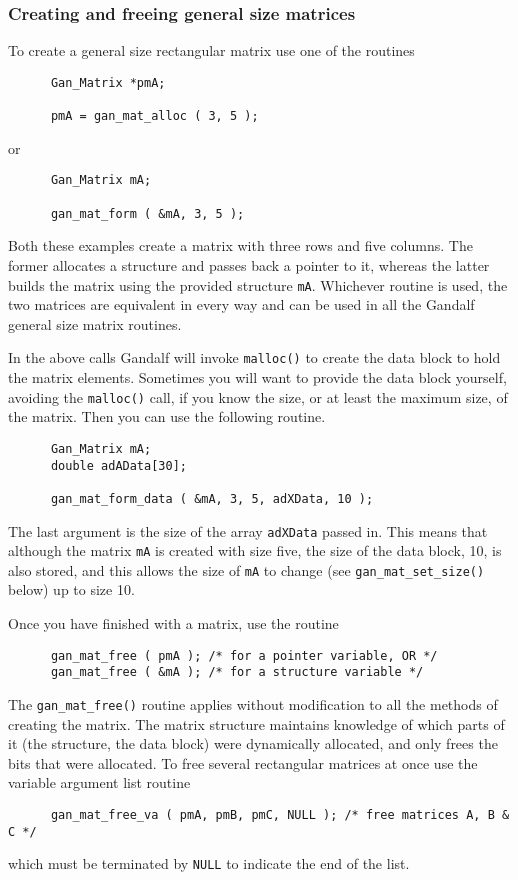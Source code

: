 \subsubsection{Creating and freeing general size matrices}
To create a general size rectangular matrix use one of the routines
\begin{verbatim}
      Gan_Matrix *pmA;

      pmA = gan_mat_alloc ( 3, 5 );
\end{verbatim}
or
\begin{verbatim}
      Gan_Matrix mA;

      gan_mat_form ( &mA, 3, 5 );
\end{verbatim}
Both these examples create a matrix with three rows and five columns.
The former allocates
a structure and passes back a pointer to it, whereas the latter builds the
matrix using the provided structure {\tt mA}. Whichever routine is used,
the two matrices are equivalent in every way and can be used in all the
Gandalf general size matrix routines.

In the above calls Gandalf will invoke {\tt malloc()} to create the data
block to hold the matrix elements. Sometimes you will want to provide the
data block yourself, avoiding the {\tt malloc()} call, if you know the size,
or at least the maximum size, of the matrix. Then you can use the
following routine.
\begin{verbatim}
      Gan_Matrix mA;
      double adAData[30];

      gan_mat_form_data ( &mA, 3, 5, adXData, 10 );
\end{verbatim}
The last argument is the size of the array {\tt adXData} passed in.
This means that although the matrix {\tt mA} is created with size five,
the size of the data block, 10, is also stored, and this allows the
size of {\tt mA} to change (see {\tt gan\_mat\_set\_size()} below) up to
size 10.

Once you have finished with a matrix, use the routine
\begin{verbatim}
      gan_mat_free ( pmA ); /* for a pointer variable, OR */
      gan_mat_free ( &mA ); /* for a structure variable */
\end{verbatim}
The {\tt gan\_mat\_free()} routine applies without modification to all
the methods of creating the matrix. The matrix structure maintains
knowledge of which parts of it (the structure, the data block) were
dynamically allocated, and only frees the bits that were allocated.
To free several rectangular matrices at once use the variable argument
list routine
\begin{verbatim}
      gan_mat_free_va ( pmA, pmB, pmC, NULL ); /* free matrices A, B & C */
\end{verbatim}
which must be terminated by {\tt NULL} to indicate the end of the list.

